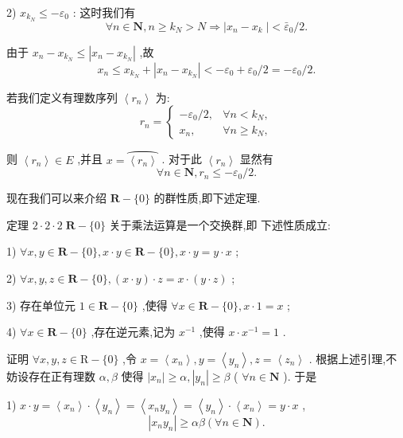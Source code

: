 2) ${x}_{{k}_{N}} \leq   - {\varepsilon }_{0}$ : 这时我们有
$$\forall n \in  \mathbf{N},n \geq  {k}_{N} > N \Rightarrow  \left| {{x}_{n} - {x}_{k}\;}\right|  < {\bar{\varepsilon }}_{0}/2.$$

由于 ${x}_{n} - {x}_{{k}_{N}} \leq  \left| {{x}_{n} - {x}_{{k}_{N}}}\right|$ ,故
$${x}_{n} \leq  {x}_{{k}_{N}} + \left| {{x}_{n} - {x}_{{k}_{N}}}\right|  <  - {\varepsilon }_{0} + {\varepsilon }_{0}/2 =  - {\varepsilon }_{0}/2.$$

若我们定义有理数序列 $\left\langle  {r}_{n}\right\rangle$ 为:
$${r}_{n} = \left\{  \begin{matrix}  - {\varepsilon }_{0}/2, & \forall n < {k}_{N}, \\  {x}_{n}, & \forall n \geq  {k}_{N}, \end{matrix}\right.$$

则 $\left\langle  {r}_{n}\right\rangle   \in  E$ ,并且 $x = \overset{⏜}{\left\langle  {r}_{n}\right\rangle  }$ . 对于此 $\left\langle  {r}_{n}\right\rangle$ 显然有
$$\forall n \in  \mathbf{N},{r}_{n} \leq   - {\varepsilon }_{0}/2.$$

现在我们可以来介绍 $\mathbf{R} - \{ 0\}$ 的群性质,即下述定理.

定理 $2 \cdot  2 \cdot  2\;\mathbf{R} - \{ 0\}$ 关于乘法运算是一个交换群,即 下述性质成立:

1) $\forall x,y \in  \mathbf{R} - \{ 0\} ,x \cdot  y \in  \mathbf{R} - \{ 0\} ,x \cdot  y = y \cdot  x$ ;

2) $\forall x,y,z \in  \mathbf{R} - \{ 0\} ,\left( {x \cdot  y}\right)  \cdot  z = x \cdot  \left( {y \cdot  z}\right)$ ;

3) 存在单位元 $1 \in  \mathbf{R} - \{ 0\}$ ,使得 $\forall x \in  \mathbf{R} - \{ 0\} ,x \cdot  1 = x$ ;

4) $\forall x \in  \mathbf{R} - \{ 0\}$ ,存在逆元素,记为 ${x}^{-1}$ ,使得 $x \cdot  {x}^{-1} = 1$ .

证明 $\forall x,y,z \in  \mathrm{R} - \{ 0\}$ ,令 $x = \left\langle  {x}_{n}\right\rangle  ,y = \left\langle  {y}_{n}\right\rangle  ,z = \left\langle  {z}_{n}\right\rangle$ . 根据上述引理,不妨设存在正有理数 $\alpha ,\beta$ 使得 $\left| {x}_{n}\right|  \geq  \alpha ,\left| {y}_{n}\right|  \geq  \beta$ ( $\forall n \in  \mathbf{N}$ ). 于是

1) $x \cdot  y = \left\langle  {x}_{n}\right\rangle   \cdot  \left\langle  {y}_{n}\right\rangle   = \left\langle  {{x}_{n}{y}_{n}}\right\rangle   = \left\langle  {y}_{n}\right\rangle   \cdot  \left\langle  {x}_{n}\right\rangle   = y \cdot  x$ ,
$$\left| {{x}_{n}{y}_{n}}\right|  \geq  {\alpha \beta }\left( {\forall n \in  \mathbf{N}}\right) .$$

